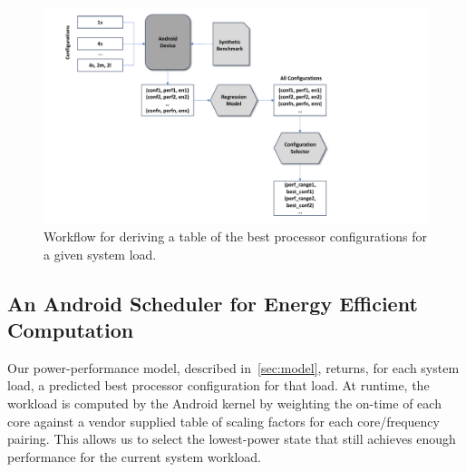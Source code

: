 \documentclass[conference]{IEEEtran}
\begin{document}
\begin{figure}[ht]
\begin{center}
\includegraphics[scale=0.5]{ims/RegressionPaper.pdf}
\end{center}
\caption{Workflow for deriving a table of the best processor configurations for a given system load.}
\label{fig:reg2}
\end{figure}


\subsection{An Android Scheduler for Energy Efficient Computation} \label{sec:schedule}

Our power-performance model, described in~\cref{sec:model}, returns, for each system load, a predicted best processor configuration for that load. At runtime, the workload is computed by the Android kernel by weighting the on-time of each core against a vendor supplied table of scaling factors for each core/frequency pairing. This allows us to select the lowest-power state that still achieves enough performance for the current system workload.
\end{document}
